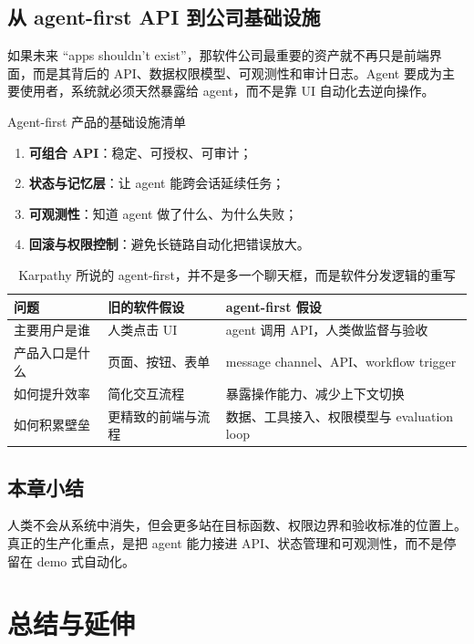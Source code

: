 \documentclass[a4paper]{article}
\begin{document}
\subsection{从 agent-first API 到公司基础设施}
如果未来 ``apps shouldn't exist''，那软件公司最重要的资产就不再只是前端界面，而是其背后的 API、数据权限模型、可观测性和审计日志。Agent 要成为主要使用者，系统就必须天然暴露给 agent，而不是靠 UI 自动化去逆向操作。

\begin{knowledgebox}{Agent-first 产品的基础设施清单}
\begin{enumerate}
    \item \textbf{可组合 API}：稳定、可授权、可审计；
    \item \textbf{状态与记忆层}：让 agent 能跨会话延续任务；
    \item \textbf{可观测性}：知道 agent 做了什么、为什么失败；
    \item \textbf{回滚与权限控制}：避免长链路自动化把错误放大。
\end{enumerate}
\end{knowledgebox}

\begin{table}[H]
\centering
\begin{tabular}{p{3.0cm}p{4.1cm}p{4.8cm}}
\toprule
\textbf{问题} & \textbf{旧的软件假设} & \textbf{agent-first 假设} \\
\midrule
主要用户是谁 & 人类点击 UI & agent 调用 API，人类做监督与验收 \\
产品入口是什么 & 页面、按钮、表单 & message channel、API、workflow trigger \\
如何提升效率 & 简化交互流程 & 暴露操作能力、减少上下文切换 \\
如何积累壁垒 & 更精致的前端与流程 & 数据、工具接入、权限模型与 evaluation loop \\
\bottomrule
\end{tabular}
\caption{Karpathy 所说的 agent-first，并不是多一个聊天框，而是软件分发逻辑的重写}
\end{table}

\subsection{本章小结}
人类不会从系统中消失，但会更多站在目标函数、权限边界和验收标准的位置上。真正的生产化重点，是把 agent 能力接进 API、状态管理和可观测性，而不是停留在 demo 式自动化。


\section{总结与延伸}
\end{document}
